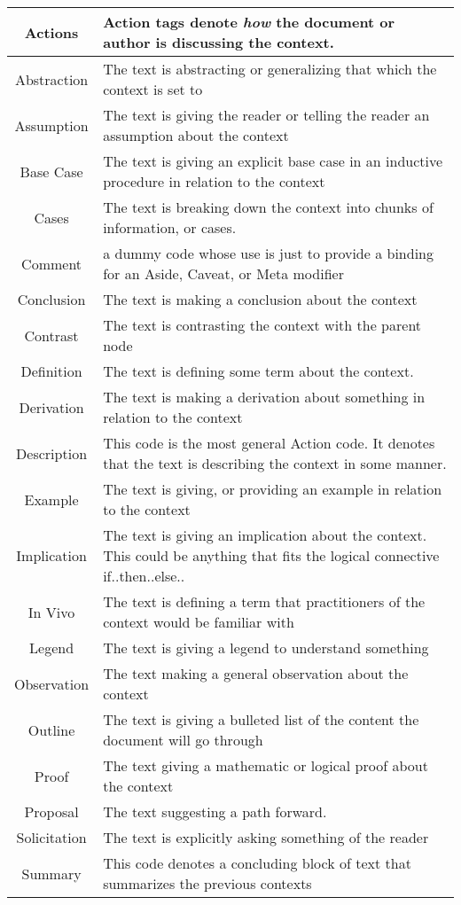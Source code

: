 \begin{table}[h!]
\begin{tabular}{c p{1.8\linewidth}}
    
    \textbf{Actions} & Action tags denote \emph{how} the document or author is discussing the context.\\
    \hline
    Abstraction & The text is abstracting or generalizing that which the context is set to\\
    Assumption & The text is giving the reader or telling the reader an assumption about the context \\
    Base Case & The text is giving an explicit base case in an inductive procedure in relation to the context\\
    Cases & The text is breaking down the context into chunks of information, or cases.\\
    Comment & a dummy code whose use is just to provide a binding for an Aside, Caveat, or Meta modifier\\
    Conclusion & The text is making a conclusion about the context\\
    Contrast &  The text is contrasting the context with the parent node \\
    Definition & The text is defining some term about the context.\\
    Derivation & The text is making a derivation about something in relation to the context\\
    Description & This code is the most general Action code. It denotes that the text is describing the context in some manner.\\
    Example & The text is giving, or providing an example in relation to the context\\
    Implication & The text is giving an implication about the context. This could be anything that fits the logical connective if..then..else..\\
    In Vivo & The text is defining a term that practitioners of the context would be familiar with\\
    Legend & The text is giving a legend to understand something\\
    Observation & The text making a general observation about the context\\
    Outline & The text is giving a bulleted list of the content the document will go through\\
    Proof & The text giving a mathematic or logical proof about the context\\
    Proposal & The text suggesting a path forward.\\
    Solicitation & The text is explicitly asking something of the reader\\
    Summary & This code denotes a concluding block of text that summarizes the previous contexts\\


\end{tabular}
\end{table}
